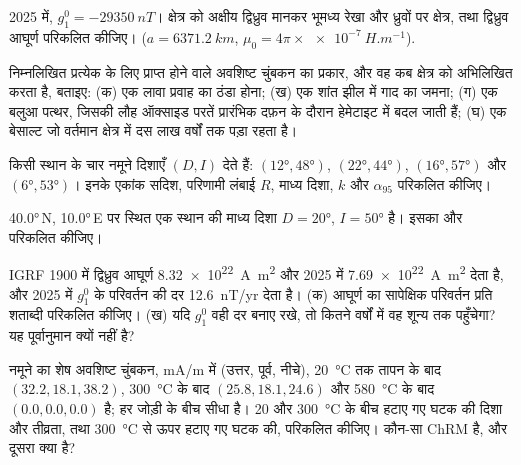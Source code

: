 \begin{exercise}[$\star$]\label{exo:b3:palaeomagnetism:3}
2025 में, $g_1^0 = \qty{-29350}{nT}$। क्षेत्र को अक्षीय द्विध्रुव मानकर
भूमध्य रेखा और ध्रुवों पर क्षेत्र, तथा द्विध्रुव आघूर्ण परिकलित कीजिए।
($a = \qty{6371.2}{km}$, $\mu_0 = 4\pi\times\qty{e-7}{H.m^{-1}}$).
\end{exercise}

\begin{exercise}[$\star$]\label{exo:b3:palaeomagnetism:4}
निम्नलिखित प्रत्येक के लिए प्राप्त होने वाले अवशिष्ट चुंबकन का प्रकार, और वह कब क्षेत्र को अभिलिखित करता है, बताइए: (क) एक लावा प्रवाह का ठंडा होना;
(ख) एक शांत झील में गाद का जमना; (ग) एक बलुआ पत्थर, जिसकी
लौह ऑक्साइड परतें प्रारंभिक दफ़न के दौरान हेमेटाइट में बदल जाती हैं; (घ) एक बेसाल्ट जो
वर्तमान क्षेत्र में दस लाख वर्षों तक पड़ा रहता है।
\end{exercise}

\begin{exercise}[$\star\star$]\label{exo:b3:palaeomagnetism:5}
किसी स्थान के चार नमूने दिशाएँ $(D, I)$ देते हैं: $(\ang{12}, \ang{48})$,
$(\ang{22}, \ang{44})$, $(\ang{16}, \ang{57})$ और $(\ang{6}, \ang{53})$।
इनके एकांक सदिश, परिणामी लंबाई $R$, माध्य दिशा, $k$
और $\alpha_{95}$ परिकलित कीजिए।
\end{exercise}

\begin{exercise}[$\star\star$]\label{exo:b3:palaeomagnetism:6}
\ang{40.0}\,N, \ang{10.0}\,E पर स्थित एक स्थान की माध्य दिशा $D = \ang{20}$,
$I = \ang{50}$ है। इसका  और  परिकलित कीजिए।
\end{exercise}

\begin{exercise}[$\star\star$]\label{exo:b3:palaeomagnetism:7}
IGRF 1900 में द्विध्रुव आघूर्ण \qty{8.32e22}{A.m^2} और
2025 में \qty{7.69e22}{A.m^2} देता है, और 2025 में $g_1^0$ के परिवर्तन की दर
\qty{+12.6}{nT/yr} देता है। (क) आघूर्ण का सापेक्षिक परिवर्तन प्रति शताब्दी
परिकलित कीजिए। (ख) यदि $g_1^0$ वही दर बनाए रखे, तो कितने वर्षों में वह शून्य तक पहुँचेगा?
यह पूर्वानुमान क्यों नहीं है?
\end{exercise}

\begin{exercise}[$\star\star$]\label{exo:b3:palaeomagnetism:8}
नमूने का शेष अवशिष्ट चुंबकन, \unit{mA/m} में (उत्तर, पूर्व, नीचे),
\qty{20}{\celsius} तक तापन के बाद $(32.2, 18.1, 38.2)$, \qty{300}{\celsius} के बाद $(25.8, 18.1, 24.6)$
और \qty{580}{\celsius} के बाद $(0.0, 0.0, 0.0)$ है; 
हर जोड़ी के बीच सीधा है। 20 और \qty{300}{\celsius} के बीच हटाए गए घटक की दिशा और
तीव्रता, तथा \qty{300}{\celsius} से ऊपर हटाए गए घटक की, परिकलित कीजिए।
कौन-सा ChRM है, और
दूसरा क्या है?
\end{exercise}

